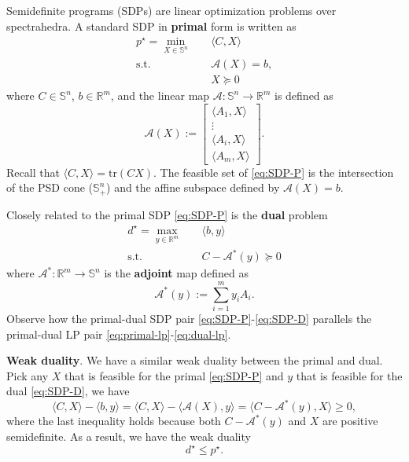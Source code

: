 \documentclass[
]{book}
\theoremstyle{definition}
\theoremstyle{definition}
\theoremstyle{definition}
\theoremstyle{definition}
\theoremstyle{remark}
\begin{document}
Semidefinite programs (SDPs) are linear optimization problems over spectrahedra. A standard SDP in \textbf{primal} form is written as
\begin{equation}
\boxed{
\begin{split}
p^\star = \min_{X \in \mathbb{S}^{n}} & \quad \langle C, X \rangle \\
\mathrm{s.t.}& \quad \mathcal{A}(X) = b, \\
& \quad X \succeq 0
\end{split}
}
\label{eq:SDP-P}
\end{equation}
where \(C \in \mathbb{S}^{n}\), \(b \in \mathbb{R}^{m}\), and the linear map \(\mathcal{A}: \mathbb{S}^{n} \rightarrow \mathbb{R}^{m}\) is defined as
\[
\mathcal{A}(X) := \begin{bmatrix} \langle A_1, X \rangle \\
\vdots \\ \langle A_i, X \rangle \\ \langle A_m, X \rangle \end{bmatrix}.
\]
Recall that \(\langle C, X \rangle = \mathrm{tr}(CX)\). The feasible set of \eqref{eq:SDP-P} is the intersection of the PSD cone (\(\mathbb{S}^{n}_{+}\)) and the affine subspace defined by \(\mathcal{A}(X) = b\).

Closely related to the primal SDP \eqref{eq:SDP-P} is the \textbf{dual} problem
\begin{equation}
\boxed{
\begin{split}
d^\star = \max_{y \in \mathbb{R}^{m}} & \quad \langle b, y \rangle \\
\mathrm{s.t.}& \quad C - \mathcal{A}^* (y) \succeq 0
\end{split}
}
\label{eq:SDP-D}
\end{equation}
where \(\mathcal{A}^{*}: \mathbb{R}^{m} \rightarrow \mathbb{S}^{n}\) is the \textbf{adjoint} map defined as
\[
\mathcal{A}^*(y) := \sum_{i=1}^m y_i A_i.
\]
Observe how the primal-dual SDP pair \eqref{eq:SDP-P}-\eqref{eq:SDP-D} parallels the primal-dual LP pair \eqref{eq:primal-lp}-\eqref{eq:dual-lp}.

\textbf{Weak duality}. We have a similar weak duality between the primal and dual. Pick any \(X\) that is feasible for the primal \eqref{eq:SDP-P} and \(y\) that is feasible for the dual \eqref{eq:SDP-D}, we have
\[
\boxed{\langle C, X \rangle - \langle b, y \rangle = \langle C, X \rangle - \langle \mathcal{A}(X), y \rangle = \langle C - \mathcal{A}^* (y), X \rangle \geq 0,}
\]
where the last inequality holds because both \(C - \mathcal{A}^*(y)\) and \(X\) are positive semidefinite. As a result, we have the weak duality
\[
d^\star \leq p^\star.
\]
\end{document}
